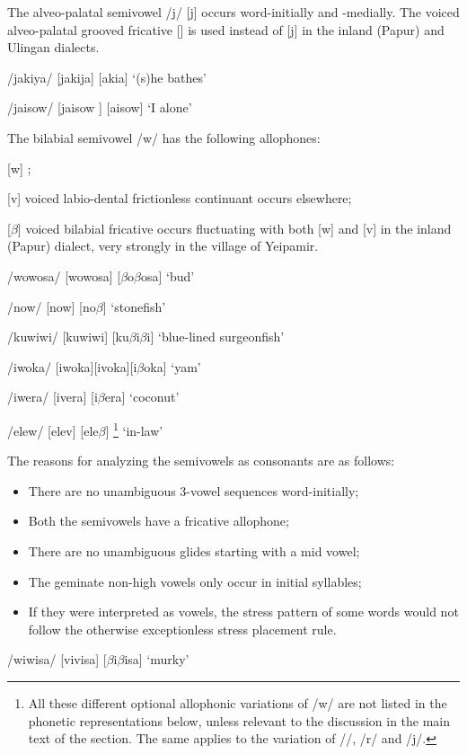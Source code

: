 The alveo-palatal semivowel /j/ [j] occurs word-initially and -medially. The voiced alveo-palatal grooved fricative [{\textyogh}] is used instead of [j] in the inland (Papur) and Ulingan dialects.

/jakiya/  [ja{{\textprimstress}kija}] {\Tilde} [{\textyogh}a{{\textprimstress}ki}{\textyogh}a]  `(s)he bathes'

/jaisow/  [{{\textprimstress}jaisow} ] {\Tilde} [{{\textprimstress}}{\textyogh}aisow]  `I alone' 

The bilabial semivowel /w/ has the following allophones:

[w]  ;

[v]  voiced labio-dental frictionless continuant occurs elsewhere;

[$\beta $]  voiced bilabial fricative occurs fluctuating with both [w] and [v] in the inland (Papur) dialect, very strongly in the village of Yeipamir.

/wowosa/  [wo{{\textprimstress}wosa}] {\Tilde} [$\beta $o{{\textprimstress}$\beta $osa}]  `bud'

/now/  [now] {\Tilde} [no$\beta $]  `stonefish'

/kuwiwi/  [ku{{\textprimstress}wiwi}] {\Tilde} [ku{{\textprimstress}$\beta $i$\beta $i}]  `blue-lined surgeonfish'

/iwoka/  [i{{\textprimstress}woka}]{\Tilde}[i{{\textprimstress}voka}]{\Tilde}[i{{\textprimstress}$\beta $oka}]  `yam'

/iwera/  [i{{\textprimstress}vera}] {\Tilde} [i{{\textprimstress}$\beta $era}]  `coconut'

/elew/  [e{{\textprimstress}lev}] {\Tilde} [e{{\textprimstress}le$\beta $}] \footnote{All these different optional allophonic variations of /w/ are not listed in the phonetic representations below, unless relevant to the discussion in the main text of the section. The same applies to the variation of /{\textphi}/, /r/ and /j/.}  `in-law'

The reasons for analyzing the semivowels as consonants are as follows:


\begin{itemize}
\item There are no unambiguous 3-vowel sequences word-initially; 

\item Both the semivowels have a fricative allophone;

\item There are no unambiguous glides starting with a mid vowel; 

\item The geminate non-high vowels only occur in initial syllables;

\item If they were interpreted as vowels, the stress pattern of some words would not follow the otherwise exceptionless stress placement rule.


\end{itemize}
/wiwisa/  [vi{{\textprimstress}visa}] {\Tilde} [$\beta $i{{\textprimstress}$\beta $isa}]  `murky'

